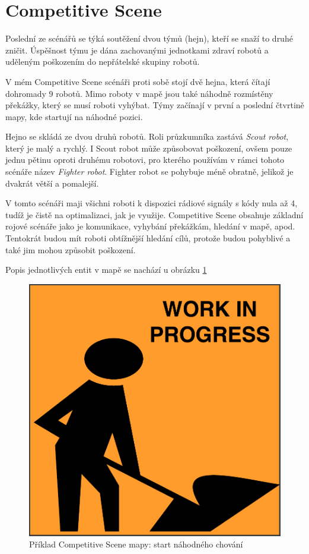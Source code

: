 \section{Competitive Scene}
Poslední ze scénářů se týká soutěžení dvou týmů (hejn), kteří se snaží to druhé zničit. Úspěšnost týmu je dána zachovanými jednotkami zdraví robotů a uděleným poškozením do nepřátelské skupiny robotů. 
 \par
 V mém Competitive Scene scénáři proti sobě stojí dvě hejna, která čítají dohromady 9 robotů. Mimo roboty v mapě jsou také náhodně rozmístěny překážky, který se musí roboti vyhýbat. Týmy začínají v první a poslední čtvrtině mapy, kde startují na náhodné pozici. 
 \par 
Hejno se skládá ze dvou druhů robotů. Roli průzkumníka zastává \textit{Scout robot}, který je malý a rychlý. I Scout robot může způsobovat poškození, ovšem pouze jednu pětinu oproti druhému robotovi, pro kterého používám v rámci tohoto scénáře název \textit{Fighter robot}. Fighter robot se pohybuje méně obratně, jelikož je dvakrát větší a pomalejší. 
\par
V tomto scénáři maji všichni roboti k dispozici rádiové signály s kódy nula až 4, tudíž je čistě na optimalizaci, jak je využije. Competitive Scene obsahuje základní rojové scénáře jako je komunikace, vyhybání překážkám, hledání v mapě, apod. Tentokrát budou mít roboti obtížnější hledání cílů, protože budou pohyblivé a také jim mohou způsobit poškození. 
\par 
Popis jednotlivých entit v mapě se nachází u obrázku \ref{obr04:CompetitiveSceneRandomStart}
\clearpage
\begin{figure}[p]\centering
	\includegraphics[width=\columnwidth]{../img/todo}
	\caption{Příklad Competitive Scene mapy: start náhodného chování}
	\label{obr04:CompetitiveSceneRandomStart}
\end{figure}
\clearpage 

